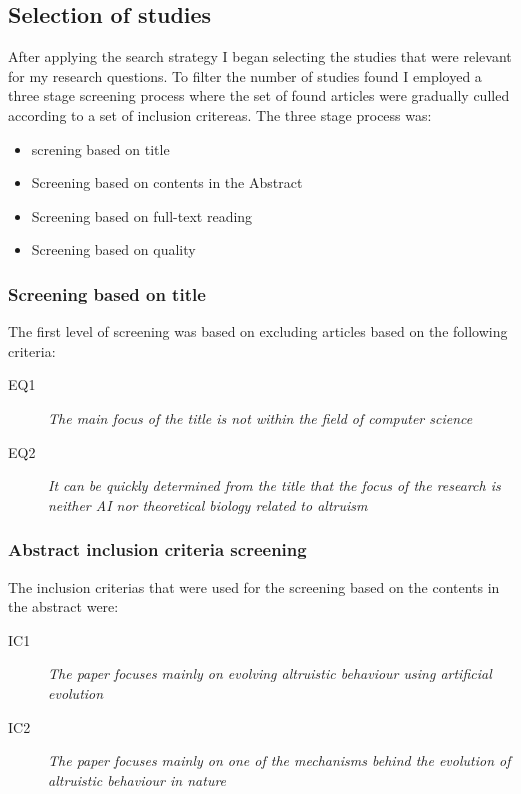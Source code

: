 \documentclass[a4paper]{book}
\begin{document}
	
\subsection{Selection of studies}

After applying the search strategy I began selecting the studies that were relevant for my research questions. To filter the number of studies found I employed a three stage screening process where the set of found articles were gradually culled according to a set of inclusion critereas. The three stage process was:

\begin{itemize}

\item screning based on title
\item Screening based on contents in the Abstract
\item Screening based on full-text reading
\item Screening based on quality

\end{itemize}

\subsubsection{Screening based on title}
The first level of screening was based on excluding articles based on the following criteria:

\begin{description}
\item[EQ1] {\it The main focus of the title is not within the field of computer science}
\item[EQ2] {\it It can be quickly determined from the title that the focus of the research is neither AI nor theoretical biology related to altruism}
\end{description}


\subsubsection{Abstract inclusion criteria screening}

The inclusion criterias that were used for the screening based on the contents in the abstract were:

\begin{description}
\item[IC1] {\it The paper focuses mainly on evolving altruistic behaviour using artificial evolution}
\item[IC2] {\it The paper focuses mainly on one of the mechanisms behind the evolution of altruistic behaviour in nature}
\end{description}
\end{document}
